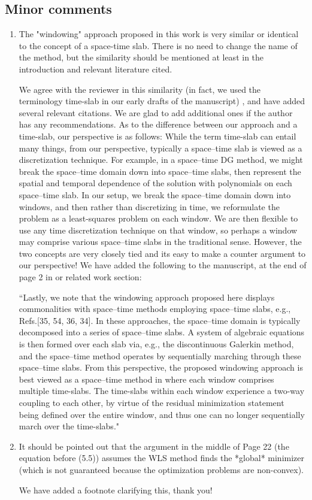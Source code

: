 \documentclass[3p,computermodern,10pt]{elsarticle}
\begin{document}
\subsection{Minor comments}
\begin{enumerate}
\item The "windowing" approach proposed in this work is very similar or identical to the concept of a space-time slab. There is no need to change the name of the method, but the similarity should be mentioned at least in the introduction and relevant literature cited.

{\color{red} We agree with the reviewer in this similarity (in fact, we used the terminology time-slab in our early drafts of the manuscript) , and have added several relevant citations. We are glad to add additional ones if the author has any recommendations. As to the difference between our approach and a time-slab, our perspective is as follows: While the term time-slab can entail many things, from our perspective, typically a space--time slab is viewed as a discretization technique. For example, in a space--time DG method, we might break the space--time domain down into space--time slabs, then represent the spatial and temporal dependence of the solution with polynomials on each space--time slab. In our setup, we break the space--time domain down into windows, and then rather than discretizing in time, we reformulate the problem as a least-squares problem on each window. We are then flexible to use any time discretization technique on that window, so perhaps a window may comprise various space--time slabs in the traditional sense. However, the two concepts are very closely tied and its easy to make a counter argument to our perspective! We have added the following to the manuscript, at the end of page 2 in or related work section:

``Lastly, we note that the windowing approach proposed here displays commonalities with space–time methods employing space–time slabs, e.g., Refs.[35, 54, 36, 34]. In these approaches, the space–time domain is typically decomposed into a series of space–time slabs. A system of algebraic equations is then formed over each slab via, e.g., the discontinuous Galerkin method, and the space–time method operates by sequentially marching through these space–time slabs. From this perspective, the proposed windowing approach is best viewed as a space–time method in where each window comprises multiple time-slabs. The time-slabs within each window experience a two-way coupling to each other, by virtue of the residual minimization statement being defined over the entire window, and thus one can no longer sequentially march over the time-slabs."
} 
\item It should be pointed out that the argument in the middle of Page 22 (the equation before (5.5)) assumes the WLS method finds the *global* minimizer (which is not guaranteed because the optimization problems are non-convex).

{\color{red} We have added a footnote clarifying this, thank you!}
\end{enumerate}
\end{document}
